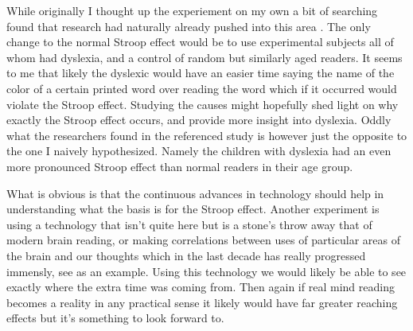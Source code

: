 \documentclass{article}
\begin{document}
While originally I thought up the experiement on my own a bit of searching found
that research had naturally already pushed into this area
\cite{Stroop-dyslexia}.  The only change to the normal Stroop effect would be to
use experimental subjects all of whom had dyslexia, and a control of random but
similarly aged readers.  It seems to me that likely the dyslexic would have an
easier time saying the name of the color of a certain printed word over reading
the word which if it occurred would violate the Stroop effect.  Studying the
causes might hopefully shed light on why exactly the Stroop effect occurs, and
provide more insight into dyslexia.  Oddly what the researchers found in the
referenced study is however just the opposite to the one I naively 
hypothesized.  Namely the children with dyslexia had an even more pronounced
Stroop effect than normal readers in their age group.  

What is obvious is that the continuous advances in technology should help in
understanding what the basis is for the Stroop effect.  Another experiment is
using a technology that isn't quite here but is a stone's throw away that of
modern brain reading, or making correlations between uses of particular areas of
the brain and our thoughts which in the last decade has really progressed
immensly, see \cite{Brain-to-text} as an example.  Using this technology we
would likely be able to see exactly where the extra time was coming from.  Then
again if real mind reading becomes a reality in any practical sense it likely
would have far greater reaching effects but it's something to look forward to.

\printbibliography[keyword=statistics , title={Statistics references}]
\printbibliography[keyword=Matplotlib , title={Matplotlib references}]
\printbibliography[keyword=SciPy , title={SciPy references}]
\printbibliography[keyword=PANDAS , title={PANDAS references}]
\printbibliography[keyword=Udacity , title={Udacity references}]
\printbibliography[keyword=LaTeX , title={{pdf\LaTeX}  references}]
\printbibliography[keyword=other , title={other references}]
\end{document}
